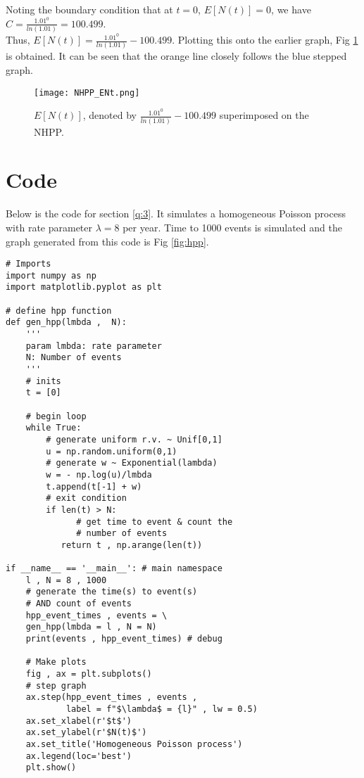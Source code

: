\documentclass[%
 reprint,
 amsmath,amssymb,
 aps,
]{revtex4-2}
\theoremstyle{definition}
\begin{document}
Noting the boundary condition that at $t=0$, $E[N(t)]=0$, we have $C = \frac{1.01^0}{ln(1.01)} = 100.499$.\\

Thus,  $E[N(t)] = \frac{1.01^0}{ln(1.01)} - 100.499$. Plotting this onto the earlier graph, Fig \ref{fig:nhppent} is obtained. It can be seen that the orange line closely follows the blue stepped graph.

\begin{figure}
\centering
\texttt{[image: NHPP\_ENt.png]}
\caption{\label{fig:nhppent}$E[N(t)]$, denoted by $\frac{1.01^0}{ln(1.01)} - 100.499$ superimposed on the NHPP.}
\end{figure}

\appendix

\section{Code}
Below is the code for section \ref{q:3}. It simulates a homogeneous Poisson process with rate parameter $\lambda=8$ per year. Time to 1000 events is simulated and the graph generated from this code is Fig \ref{fig:hpp}.
\begin{verbatim}
# Imports
import numpy as np
import matplotlib.pyplot as plt

# define hpp function
def gen_hpp(lmbda ,  N):
    '''
    param lmbda: rate parameter
    N: Number of events
    '''
    # inits
    t = [0]

    # begin loop
    while True:
        # generate uniform r.v. ~ Unif[0,1]
        u = np.random.uniform(0,1) 
        # generate w ~ Exponential(lambda)
        w = - np.log(u)/lmbda 
        t.append(t[-1] + w)
        # exit condition
        if len(t) > N:
        	  # get time to event & count the 
        	  # number of events
           return t , np.arange(len(t)) 

if __name__ == '__main__': # main namespace
    l , N = 8 , 1000
    # generate the time(s) to event(s) 
    # AND count of events 
    hpp_event_times , events = \
    gen_hpp(lmbda = l , N = N) 
    print(events , hpp_event_times) # debug
    
    # Make plots
    fig , ax = plt.subplots()
    # step graph
    ax.step(hpp_event_times , events , 
    		label = f"$\lambda$ = {l}" , lw = 0.5) 
    ax.set_xlabel(r'$t$')
    ax.set_ylabel(r'$N(t)$')
    ax.set_title('Homogeneous Poisson process')
    ax.legend(loc='best')
    plt.show()
\end{verbatim}
\end{document}
